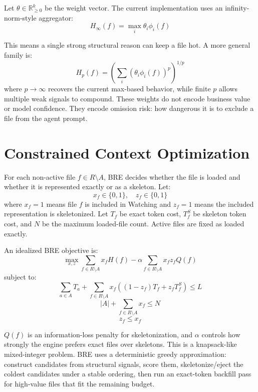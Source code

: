\documentclass[10pt,twocolumn,letterpaper]{article}
\begin{document}
Let $\theta \in \mathbb{R}_{\ge 0}^k$ be the weight vector. The current implementation uses an infinity-norm-style aggregator:
\begin{equation}
H_{\infty}(f) = \max_i \theta_i \phi_i(f)
\end{equation}

This means a single strong structural reason can keep a file hot. A more general family is:
\begin{equation}
H_p(f) = \left(\sum_i (\theta_i \phi_i(f))^p\right)^{1/p}
\end{equation}
\noindent where $p \to \infty$ recovers the current max-based behavior, while finite $p$ allows multiple weak signals to compound. These weights do not encode business value or model confidence. They encode omission risk: how dangerous it is to exclude a file from the agent prompt.

\section{Constrained Context Optimization}
For each non-active file $f \in R \setminus A$, BRE decides whether the file is loaded and whether it is represented exactly or as a skeleton. Let:
\begin{equation}
x_f \in \{0,1\}, \quad z_f \in \{0,1\}
\end{equation}
\noindent where $x_f=1$ means file $f$ is included in Watching and $z_f=1$ means the included representation is skeletonized. Let $T_f$ be exact token cost, $T_f^S$ be skeleton token cost, and $N$ be the maximum loaded-file count. Active files are fixed as loaded exactly.

An idealized BRE objective is:
\begin{equation}
\max_{x,z} \sum_{f \in R \setminus A} x_f H(f) - \alpha \sum_{f \in R \setminus A} x_f z_f Q(f)
\end{equation}
\noindent subject to:
\begin{equation}
\sum_{a \in A} T_a + \sum_{f \in R \setminus A} x_f \left((1-z_f)T_f + z_f T_f^S\right) \le L
\end{equation}
\begin{equation}
|A| + \sum_{f \in R \setminus A} x_f \le N
\end{equation}
\begin{equation}
z_f \le x_f
\end{equation}

$Q(f)$ is an information-loss penalty for skeletonization, and $\alpha$ controls how strongly the engine prefers exact files over skeletons. This is a knapsack-like mixed-integer problem. BRE uses a deterministic greedy approximation: construct candidates from structural signals, score them, skeletonize/eject the coldest candidates under a stable ordering, then run an exact-token backfill pass for high-value files that fit the remaining budget.
\end{document}
